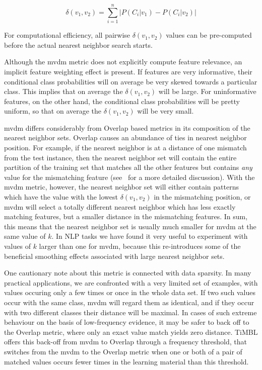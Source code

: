 \documentclass{report}
\begin{document}
\begin{equation}
\delta(v_{1}, v_{2}) = \sum_{i=1}^{n} \left| P(C_{i}|v_{1}) - P(C_{i}|v_{2})
\right|
\label{MVDMeq}
\end{equation}

For computational efficiency, all pairwise $\delta(v_{1}, v_{2})$
values can be pre-comput\-ed before the actual nearest neighbor search
starts.

Although the {\sc mvdm} metric does not explicitly compute feature
relevance, an implicit feature weighting effect is present. If
features are very informative, their conditional class probabilities
will on average be very skewed towards a particular class. This
implies that on average the $\delta(v_{1}, v_{2})$ will be large. For
uninformative features, on the other hand, the conditional class
probabilities will be pretty uniform, so that on average the
$\delta(v_{1}, v_{2})$ will be very small.

{\sc mvdm} differs considerably from Overlap based metrics in its
composition of the nearest neighbor sets. Overlap causes an abundance
of ties in nearest neighbor position. For example, if the nearest
neighbor is at a distance of one mismatch from the test instance, then
the nearest neighbor set will contain the entire partition of the
training set that matches all the other features but contains {\em
any} value for the mismatching feature (see~ for a
more detailed discussion). With the {\sc mvdm} metric, however, the
nearest neighbor set will either contain patterns which have the value
with the lowest $\delta(v_{1}, v_{2})$ in the mismatching position, or
{\sc mvdm} will select a totally different nearest neighbor which has
less exactly matching features, but a smaller distance in the
mismatching features. In sum, this means that the nearest neighbor set
is usually much smaller for {\sc mvdm} at the same value of $k$. In
NLP tasks we have found it very useful to experiment with values of
$k$ larger than one for {\sc mvdm}, because this re-introduces some of
the beneficial smoothing effects associated with large nearest
neighbor sets.

One cautionary note about this metric is connected with data
sparsity. In many practical applications, we are confronted with a
very limited set of examples, with values occuring only a few times or
once in the whole data set. If two such values occur with the same
class, {\sc mvdm} will regard them as identical, and if they occur
with two different classes their distance will be maximal. In cases of
such extreme behaviour on the basis of low-frequency evidence, it may
be safer to back off to the Overlap metric, where only an exact value
match yields zero distance. TiMBL offers this back-off from {\sc mvdm}
to Overlap through a frequency threshold, that switches from the {\sc
mvdm} to the Overlap metric when one or both of a pair of matched
values occurs fewer times in the learning material than this
threshold.
\end{document}
